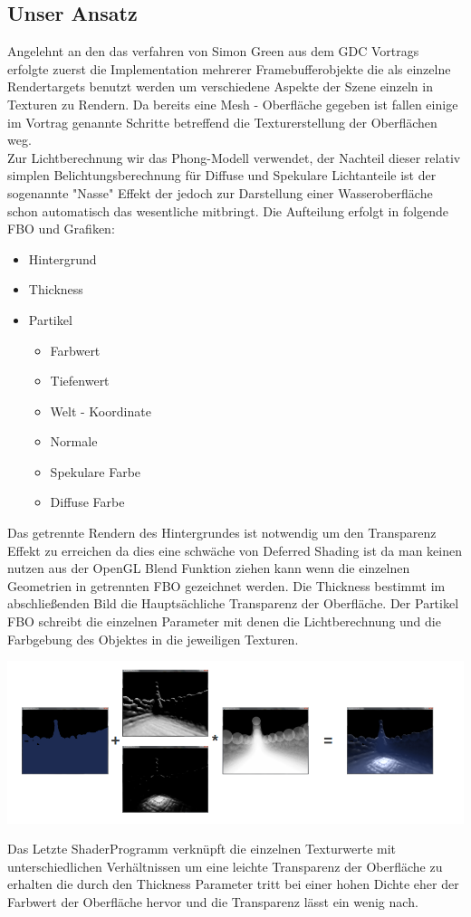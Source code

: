 \subsection*{Unser Ansatz} Angelehnt an den das verfahren von Simon Green aus dem GDC Vortrags \cite{DSGDC} erfolgte zuerst die Implementation mehrerer Framebufferobjekte die als einzelne Rendertargets benutzt werden um verschiedene Aspekte der Szene einzeln in Texturen zu Rendern. Da bereits eine Mesh - Oberfläche gegeben ist fallen einige im Vortrag genannte Schritte betreffend die Texturerstellung der Oberflächen weg.\\
Zur Lichtberechnung wir das Phong-Modell verwendet, der Nachteil dieser relativ simplen Belichtungsberechnung für Diffuse und Spekulare Lichtanteile ist der sogenannte "Nasse" Effekt der jedoch zur Darstellung einer Wasseroberfläche schon automatisch das wesentliche mitbringt.
\newpage
Die Aufteilung erfolgt in folgende FBO und Grafiken:
\begin{itemize}
\item Hintergrund
\item Thickness
\item Partikel
	\begin{itemize}
	\item Farbwert
	\item Tiefenwert
	\item Welt - Koordinate
	\item Normale
	\item Spekulare Farbe
	\item Diffuse Farbe
	\end{itemize}
\end{itemize}  

\noindent Das getrennte Rendern des Hintergrundes ist notwendig um den Transparenz Effekt zu erreichen da dies eine schwäche von Deferred Shading ist da man keinen nutzen aus der OpenGL Blend Funktion ziehen kann wenn die einzelnen Geometrien in getrennten FBO gezeichnet werden. Die Thickness bestimmt im abschließenden Bild die Hauptsächliche Transparenz der Oberfläche. Der Partikel FBO schreibt die einzelnen Parameter mit denen die Lichtberechnung und die Farbgebung des Objektes in die jeweiligen Texturen.
\begin{center}
\includegraphics[scale=0.7]{images/Dereffered}
\end{center}
\noindent Das Letzte ShaderProgramm verknüpft die einzelnen Texturwerte mit unterschiedlichen Verhältnissen um eine leichte Transparenz der Oberfläche zu erhalten die durch den Thickness Parameter tritt bei einer hohen Dichte eher der Farbwert der Oberfläche hervor und die Transparenz lässt ein wenig nach.